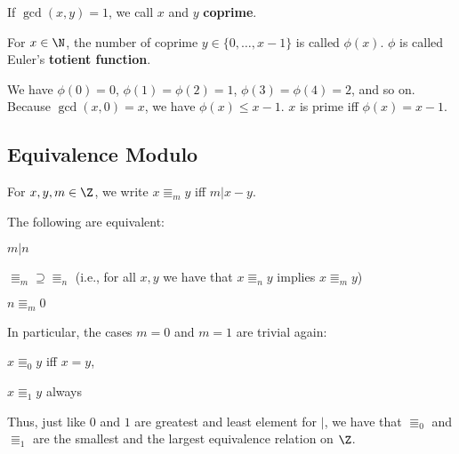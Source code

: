 \begin{definition}
If $\gcd(x,y)=1$, we call $x$ and $y$ \textbf{coprime}.

For $x\in\N$, the number of coprime $y\in\{0,\ldots,x-1\}$ is called $\phi(x)$.
$\phi$ is called Euler's \textbf{totient function}.
\end{definition}

\begin{example}
We have $\phi(0)=0$, $\phi(1)=\phi(2)=1$, $\phi(3)=\phi(4)=2$, and so on.
Because $\gcd(x,0)=x$, we have $\phi(x)\leq x-1$.
$x$ is prime iff $\phi(x)=x-1$.
\end{example}

\subsection{Equivalence Modulo}\label{sec:math:modulo}

\begin{definition}\label{def:math:modulo}
 For $x,y,m\in\Z$, we write $x\Equiv_m y$ iff $m|x-y$.
\end{definition}

\begin{theorem}
The following are equivalent:
\begin{compactitem}
\item $m|n$
\item $\Equiv_m\supseteq \Equiv_n$ (i.e., for all $x,y$ we have that $x\Equiv_n y$ implies $x\Equiv_m y$)
\item $n\Equiv_m 0$
\end{compactitem}
\end{theorem}

\begin{remark}
In particular, the cases $m=0$ and $m=1$ are trivial again:
\begin{compactitem}
\item $x\Equiv_0 y$ iff $x=y$,
\item $x\Equiv_1 y$ always
\end{compactitem}

Thus, just like $0$ and $1$ are greatest and least element for $|$, we have that $\Equiv_0$ and $\Equiv_1$ are the smallest and the largest equivalence relation on $\Z$.
\end{remark}

